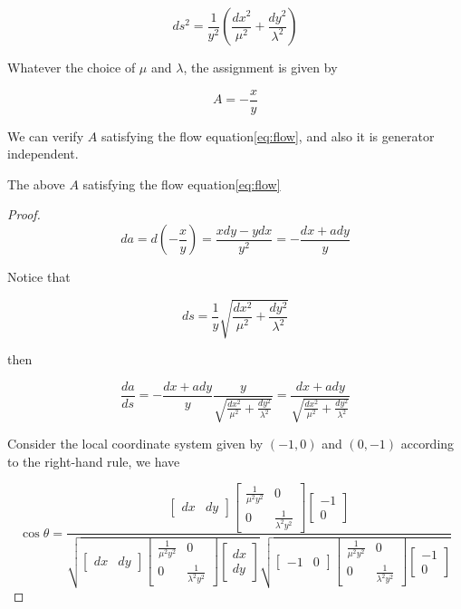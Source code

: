 $$
ds^2 = \frac{1}{y^2}(\frac{dx^2}{\mu^2} + \frac{dy^2}{\lambda^2})
$$

Whatever the choice of $\mu$ and $\lambda$, the assignment is given by

\begin{equation}
A = - \frac{x}{y}
\end{equation}

We can verify $A$ satisfying the flow equation\eqref{eq:flow}, and also it is generator independent.

\begin{theorem}
The above $A$ satisfying the flow equation\eqref{eq:flow}
\end{theorem}

\begin{proof}
$$
da = d(-\frac{x}{y}) = \frac{xdy - ydx}{y^2} = -\frac{dx + a dy}{y}
$$

Notice that

$$
ds = \frac{1}{y}\sqrt{\frac{dx^2}{\mu^2} + \frac{dy^2}{\lambda^2}}
$$

then

$$
\frac{da}{ds} = - \frac{dx + a dy}{y} \frac{y}{\sqrt{\frac{dx^2}{\mu^2} + \frac{dy^2}{\lambda^2}}} = \frac{dx + a dy}{\sqrt{\frac{dx^2}{\mu^2} + \frac{dy^2}{\lambda^2}}}
$$

Consider the local coordinate system given by $(-1, 0)$ and $(0, -1)$ according to the right-hand rule, we have

$$
\cos \theta = \frac{\begin{bmatrix} dx & dy \end{bmatrix} \begin{bmatrix} \frac{1}{\mu^2 y^2} & 0 \\ 0 & \frac{1}{\lambda^2 y^2} \end{bmatrix} \begin{bmatrix} -1 \\ 0 \end{bmatrix}}{\sqrt{\begin{bmatrix} dx & dy \end{bmatrix} \begin{bmatrix} \frac{1}{\mu^2 y^2} & 0 \\ 0 & \frac{1}{\lambda^2 y^2} \end{bmatrix} \begin{bmatrix} dx \\ dy \end{bmatrix}}\sqrt{\begin{bmatrix} -1 & 0 \end{bmatrix} \begin{bmatrix} \frac{1}{\mu^2 y^2} & 0 \\ 0 & \frac{1}{\lambda^2 y^2} \end{bmatrix} \begin{bmatrix} -1 \\ 0 \end{bmatrix}}}
$$


\end{proof}
